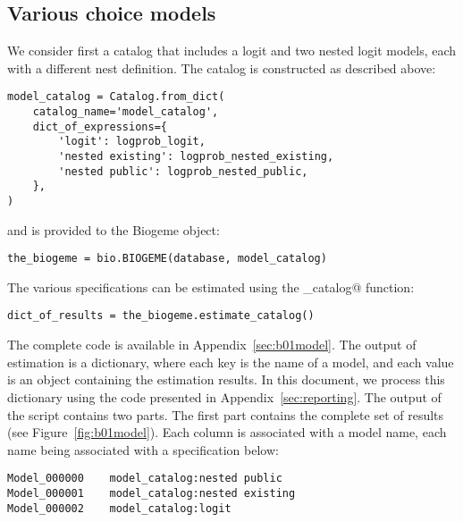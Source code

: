 \documentclass[12pt,a4paper]{article}
\begin{document}
\subsection{Various choice models}
We consider first a catalog that includes a logit and two nested logit
models, each with a different nest definition. The catalog is constructed as described above:
\begin{lstlisting}
model_catalog = Catalog.from_dict(
    catalog_name='model_catalog',
    dict_of_expressions={
        'logit': logprob_logit,
        'nested existing': logprob_nested_existing,
        'nested public': logprob_nested_public,
    },
)
\end{lstlisting}
and is provided to the Biogeme object:
\begin{lstlisting}
the_biogeme = bio.BIOGEME(database, model_catalog)
\end{lstlisting}
The various specifications can  be estimated using the \lstinline@estimate_catalog@ function:
\begin{lstlisting}
dict_of_results = the_biogeme.estimate_catalog()
\end{lstlisting}
The complete code is available in Appendix~\ref{sec:b01model}. The
output of estimation is a dictionary, where each key is the name of a
model, and each value is an object containing the estimation
results. In this document, we process this dictionary using the code
presented in Appendix~\ref{sec:reporting}. The output of the script
contains two parts. The first part contains the complete set of
results (see Figure~\ref{fig:b01model}). Each column is associated with
a model name, each name being associated with a specification below:
\begin{lstlisting}
Model_000000	model_catalog:nested public
Model_000001	model_catalog:nested existing
Model_000002	model_catalog:logit
\end{lstlisting}
\end{document}
